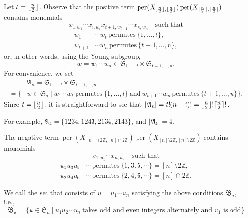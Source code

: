\documentclass[12pt]{amsart}
\DeclarePairedDelimiter\ceil{\lceil}{\rceil}
\DeclarePairedDelimiter\floor{\lfloor}{\rfloor}
\theoremstyle{definition}
\numberwithin{equation}{section}
\newcommand{\sn}{\mathfrak{S}_n}
\DeclareMathOperator{\perm}{per}
\begin{document}
Let $t=\floor{\tfrac{n}{2}}$. Observe that the positive term $\perm(X_{\floor{\frac{n}{2}},\floor{\frac{n}{2}}})\perm(X_{\ceil{\frac{n}{2}},\ceil{\frac{n}{2}}})$ contains monomials \begin{equation*}
x_{1,w_1} \cdots x_{t,w_{t}} x_{t+1,w_{t+1}}\cdots x_{n,w_{n}} \quad \text{such that}
\end{equation*}
\begin{align*}
            w_1&\cdots w_t \ \text{permutes} \ \{1,\dotsc,t\}, \\
            w_{t+1}&\cdots w_n \ \text{permutes} \ \{t+1,\dotsc,n\},
        \end{align*}
        or, in other words, using the Young subgroup, \begin{equation*}
            w=w_1\cdots w_n \in \mathfrak{S}_{1, \dotsc, t}\times \mathfrak{S}_{t+1, \dotsc, n}.
        \end{equation*}
For convenience, we set
\begin{equation}\label{def:An}
    \begin{split}
    &\mathfrak A_n = \mathfrak{S}_{1, \dotsc, t}\times \mathfrak{S}_{t+1, \dotsc, n} \\
    = \{&w \in \sn \ | \ w_1\cdots w_{t} \ \text{permutes} \ \{1,\dotsc,t\} \ \text{and} \ w_{t+1} \cdots w_n \ \text{permutes} \ \{t+1,\dotsc,n\} \}.
\end{split}
\end{equation}
Since $t=\floor{\tfrac{n}{2}}$, it is straightforward to see that $|\mathfrak A_n|=t!(n-t)!= \floor{\tfrac{n}{2}}!\ceil{\tfrac{n}{2}}!$.

For example, $\mathfrak A_4 = \{1234, 1243, 2134, 2143\}$, and $|\mathfrak A_4| = 4$.

The negative term $\perm(X_{[n]\cap 2\mathbb{Z},[n]\cap 2\mathbb{Z}})\perm(X_{[n]\setminus 2\mathbb{Z}, [n]\setminus 2\mathbb{Z}})$ contains monomials \begin{equation*}
x_{1,u_1} \cdots x_{n,u_{n}} \quad \text{such that} \end{equation*}
\begin{align*}
            u_1u_3u_5&\cdots  \ \text{permutes} \ \{1,3,5,\cdots\} = [n]\setminus 2\mathbb{Z}, \\
            u_2u_4u_6&\cdots  \ \text{permutes} \ \{2,4,6,\cdots\} = [n]\cap 2\mathbb{Z}.
        \end{align*}

We call the set that consists of $u = u_1\cdots u_n$ satisfying the above conditions $\mathfrak B_n$, i.e., \begin{equation}\label{def:Bn}
    \mathfrak B_n = \{u\in \sn \ | \ u_1u_2\cdots u_n \ \text{takes odd and even integers alternately and $u_1$ is odd} \}
\end{equation}
\end{document}
